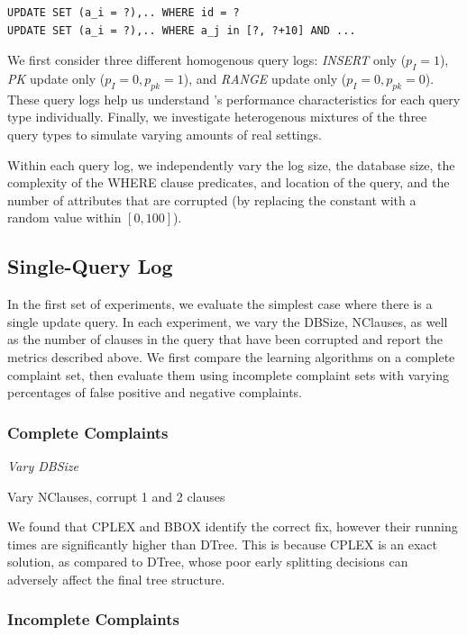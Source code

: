 {\scriptsize
\begin{verbatim}
UPDATE SET (a_i = ?),.. WHERE id = ?
UPDATE SET (a_i = ?),.. WHERE a_j in [?, ?+10] AND ...
\end{verbatim}
}

We first consider three different homogenous query logs: {\it INSERT} only ($p_I = 1$), 
{\it PK} update only ($p_I = 0, p_{pk} = 1$), and {\it RANGE} update only ($p_I = 0, p_{pk} = 0$).
These query logs help us understand \sys's performance characteristics for each query type individually.  
Finally, we investigate heterogenous mixtures of the three query types to simulate varying amounts of real settings.

Within each query log, we independently vary the log size, the
database size, the complexity of the WHERE clause predicates, and
location of the query, and the number of attributes that are corrupted
(by replacing the constant with a random value within $[0, 100]$).




\subsection{Single-Query Log}

In the first set of experiments, we evaluate the simplest case where there
is a single update query.  In each experiment, we vary the DBSize,
NClauses, as well as the number of clauses in the query that have
been corrupted and report the metrics described above.  We first 
compare the learning algorithms on a complete complaint set, then evaluate them
using incomplete complaint sets with varying percentages of false positive and negative complaints.

\subsubsection{Complete Complaints}

{\it Vary DBSize

Vary NClauses, corrupt 1 and 2 clauses
}

We found that CPLEX and BBOX identify the correct fix, however their
running times are significantly higher than DTree.  This is because
CPLEX is an exact solution, as compared to DTree, whose poor early
splitting decisions can adversely affect the final tree structure.

\subsubsection{Incomplete Complaints}


